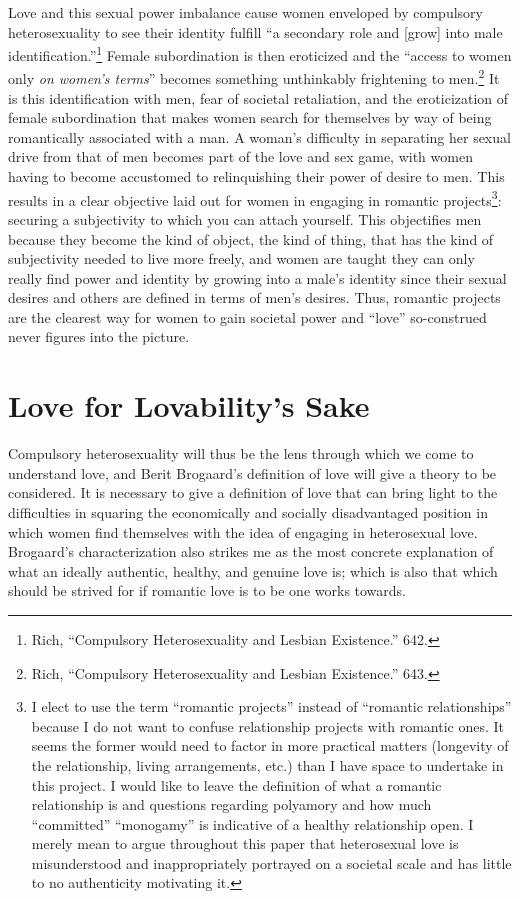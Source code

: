 Love and this sexual power imbalance cause women enveloped by compulsory
heterosexuality to see their identity fulfill ``a secondary role and
[grow] into male identification.''\footnote{Rich, ``Compulsory
  Heterosexuality and Lesbian Existence.'' 642.} Female
subordination is then eroticized and the ``access to women only \emph{on
women's terms}'' becomes something unthinkably frightening to
men.\footnote{Rich, ``Compulsory
  Heterosexuality and Lesbian Existence.'' 643.} It is this identification with men, fear of
societal retaliation, and the eroticization of female subordination that
makes women search for themselves by way of being romantically
associated with a man. A woman's difficulty in separating her sexual
drive from that of men becomes part of the love and sex game, with women
having to become accustomed to relinquishing their power of desire to
men. This results in a clear objective laid out for women in engaging in
romantic projects\footnote{I elect to use the term ``romantic projects''
  instead of ``romantic relationships'' because I do not want to confuse
  relationship projects with romantic ones. It seems the former would
  need to factor in more practical matters (longevity of the
  relationship, living arrangements, etc.) than I have space to
  undertake in this project. I would like to leave the definition of
  what a romantic relationship is and questions regarding polyamory and
  how much ``committed'' ``monogamy'' is indicative of a healthy
  relationship open. I merely mean to argue throughout this paper that
  heterosexual love is misunderstood and inappropriately portrayed on a
  societal scale and has little to no authenticity motivating it.}:
securing a subjectivity to which you can attach yourself. This
objectifies men because they become the kind of object, the kind of
thing, that has the kind of subjectivity needed to live more freely, and
women are taught they can only really find power and identity by growing
into a male's identity since their sexual desires and others are defined
in terms of men's desires. Thus, romantic projects are the clearest way
for women to gain societal power and ``love'' so-construed never figures
into the picture.

\section{Love for Lovability's Sake}

Compulsory heterosexuality will thus be the lens through which we come
to understand love, and Berit Brogaard's definition of love will give a
theory to be considered. It is necessary to give a definition of love
that can bring light to the difficulties in squaring the economically
and socially disadvantaged position in which women find themselves with
the idea of engaging in heterosexual love. Brogaard's characterization
also strikes me as the most concrete explanation of what an ideally
authentic, healthy, and genuine love is; which is also that which should
be strived for if romantic love is to be one works towards.


